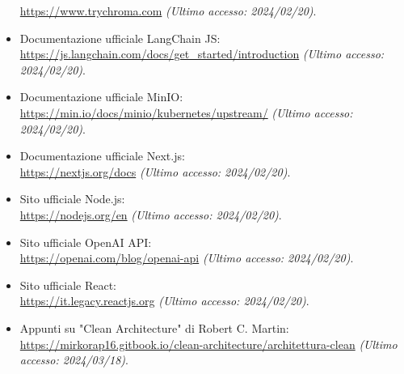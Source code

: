 \begin{itemize}
    \url{https://www.trychroma.com} \textit{(Ultimo accesso: 2024/02/20)}.
    \item Documentazione ufficiale LangChain JS: \\
    \url{https://js.langchain.com/docs/get_started/introduction} \textit{(Ultimo accesso: 2024/02/20)}.
    \item Documentazione ufficiale MinIO: \\
    \url{https://min.io/docs/minio/kubernetes/upstream/} \textit{(Ultimo accesso: 2024/02/20)}.
    \item Documentazione ufficiale Next.js: \\
    \url{https://nextjs.org/docs} \textit{(Ultimo accesso: 2024/02/20)}.
    \item Sito ufficiale Node.js: \\
    \url{https://nodejs.org/en} \textit{(Ultimo accesso: 2024/02/20)}.
    \item Sito ufficiale OpenAI API: \\
    \url{https://openai.com/blog/openai-api} \textit{(Ultimo accesso: 2024/02/20)}.
    \item Sito ufficiale React: \\
    \url{https://it.legacy.reactjs.org} \textit{(Ultimo accesso: 2024/02/20)}.
    \item Appunti su "Clean Architecture" di Robert C. Martin: \\
    \url{https://mirkorap16.gitbook.io/clean-architecture/architettura-clean} \textit{(Ultimo accesso: 2024/03/18)}.
\end{itemize}
